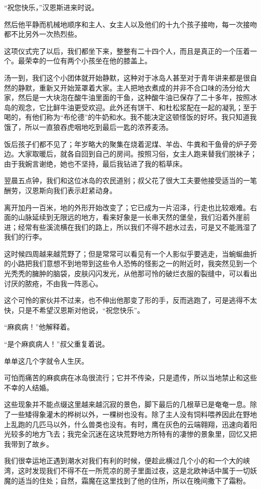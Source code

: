 \documentclass[10pt]{book}
\begin{document}
“祝您快乐，”汉恩斯进来时说。

然后他平静而机械地顺序和主人、女主人以及他们的十九个孩子接吻，每一次接吻都不比另外一次热烈些。

这项仪式完了以后，我们都坐下来，整整有二十四个人，而且是真正的一个压着一个。最荣幸的一位有两个小孩坐在他的膝盖上。

汤一到，我们这个小团体就开始静默，这种对于冰岛人甚至对于青年讲来都是很自然的静默，重新又开始笼罩着大家。主人把地衣煮成的并非不合口味的汤分给大家，然后是一大块泡在酸牛油里面的干鱼，这种酸牛油已保存了二十多年，按照冰岛的观念，它比鲜牛油更受欢迎。此外还有饼干、和杜松浆配在一起的凝乳；至于喝的，有他们称为“布伦德”的牛奶和水。我不能决定这顿怪饭的好坏。我只知道我饿了，所以一直狼吞虎咽地吃到最后一匙的浓荞麦汤。

饭后孩子们都不见了；年岁略大的聚集在烧着泥煤、羊齿、牛粪和干鱼骨的炉子旁边。大家取暖后，就各自回到自己的房间。按照习俗，女主人跑来替我们脱袜子；由于我婉言谢绝，她也不坚持，最后我钻进了我的稻草床。

翌晨五点钟，我们和这位冰岛的农民道别；叔父花了很大工夫要他接受适当的一笔酬劳，汉恩斯向我们表示赶紧动身。

离开加丹一百米，地的外形开始改变了；它已成为一片沼泽，行走也比较艰难。右面的山脉延续到无限远的地方，看来好象是一长串天然的堡垒，我们沿着外崖前进；经常有些溪流横在我们的路上，所以我们不得不趟水过去，可是又不能溅湿了我们的行李。

这时候四周越来越荒野了；但是常常可以看见有一个人影似乎要逃走，当蜿蜒曲折的小路把我们意想不到地带到这些令人恐怖的怪影之一的附近时，我突然见到一个光秃秃的臃肿的脑袋，皮肤闪闪发光，从他那可怜的破烂衣服的裂缝中，可以看出讨厌的脓疮，不由我一阵恶心。

这个可怜的家伙并不过来，也不伸出他那变了形的手，反而逃跑了，可是逃得不太快，只是不希望汉恩斯对他说，“祝您快乐”。

“麻疯病！”他解释着。

“是个麻疯病人！”叔父重复着说。

单单这几个字就令人生厌。

可怕而痛苦的麻疯病在冰岛很流行；它并不传染，只是遗传，所以当地禁止和这些不幸的人结婚。

这些现象并不能点缀这里越来越沉寂的景色，脚下最后的几根草已是奄奄一息。除了一些矮得象灌木的桦树以外，一棵树也没有。除了主人没有饲料喂养因此在野地上乱跑的几匹马以外，什么兽类也没有。有时，鹰在灰色的云端翱翔，迅速向着阳光较多的地方飞去；我完全沉迷在这块荒野地方所特有的凄惨的景象里，回忆又把我带到了故乡。

我们很幸运地正遇到潮水对我们有利的时候，便趁此横过几个小的和一个大的峡湾，这时发现我们不得不在一所荒凉的房子里面过夜，这是北欧神话中属于一切妖魔的适当的住处；自然，霜魔在这里找到了他的住所，所以在晚间撒下了霜粉。
\end{document}
